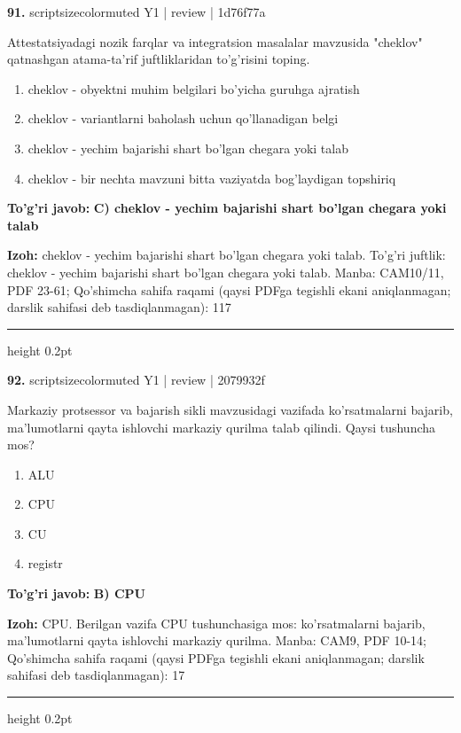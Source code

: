 \documentclass[10pt,a4paper]{article}
\begin{document}
{\bfseries\sffamily\color{ink} 91.} {scriptsizecolor{muted} Y1 | review | 1d76f77a}
\par
Attestatsiyadagi nozik farqlar va integratsion masalalar mavzusida "cheklov" qatnashgan atama-ta'rif juftliklaridan to'g'risini toping.
\begin{enumerate}[label=\Alph*),leftmargin=9mm]
\item cheklov - obyektni muhim belgilari bo'yicha guruhga ajratish
\item cheklov - variantlarni baholash uchun qo'llanadigan belgi
\item cheklov - yechim bajarishi shart bo'lgan chegara yoki talab
\item cheklov - bir nechta mavzuni bitta vaziyatda bog'laydigan topshiriq
\end{enumerate}
\begin{tcolorbox}[enhanced,breakable,colback=teal!4,colframe=teal!60!black,boxrule=0.45pt,arc=1.2mm,left=2.7mm,right=2.7mm,top=1.8mm,bottom=1.8mm,before skip=2mm,after skip=2mm]
{\bfseries\sffamily\color{teal}To'g'ri javob:} \textbf{C) cheklov - yechim bajarishi shart bo'lgan chegara yoki talab}
\par\smallskip
{\bfseries Izoh:} cheklov - yechim bajarishi shart bo'lgan chegara yoki talab. To'g'ri juftlik: cheklov - yechim bajarishi shart bo'lgan chegara yoki talab. Manba: CAM10/11, PDF 23-61; Qo'shimcha sahifa raqami (qaysi PDFga tegishli ekani aniqlanmagan; darslik sahifasi deb tasdiqlanmagan): 117
\end{tcolorbox}
\vspace{2mm}\hrule height 0.2pt\vspace{3mm}

{\bfseries\sffamily\color{ink} 92.} {scriptsizecolor{muted} Y1 | review | 2079932f}
\par
Markaziy protsessor va bajarish sikli mavzusidagi vazifada ko'rsatmalarni bajarib, ma'lumotlarni qayta ishlovchi markaziy qurilma talab qilindi. Qaysi tushuncha mos?
\begin{enumerate}[label=\Alph*),leftmargin=9mm]
\item ALU
\item CPU
\item CU
\item registr
\end{enumerate}
\begin{tcolorbox}[enhanced,breakable,colback=teal!4,colframe=teal!60!black,boxrule=0.45pt,arc=1.2mm,left=2.7mm,right=2.7mm,top=1.8mm,bottom=1.8mm,before skip=2mm,after skip=2mm]
{\bfseries\sffamily\color{teal}To'g'ri javob:} \textbf{B) CPU}
\par\smallskip
{\bfseries Izoh:} CPU. Berilgan vazifa CPU tushunchasiga mos: ko'rsatmalarni bajarib, ma'lumotlarni qayta ishlovchi markaziy qurilma. Manba: CAM9, PDF 10-14; Qo'shimcha sahifa raqami (qaysi PDFga tegishli ekani aniqlanmagan; darslik sahifasi deb tasdiqlanmagan): 17
\end{tcolorbox}
\vspace{2mm}\hrule height 0.2pt\vspace{3mm}
\end{document}
